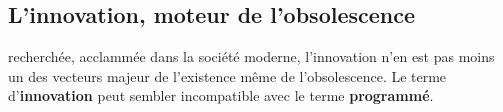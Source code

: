 \subsection{L'innovation, moteur de l'obsolescence}
recherchée, acclammée dans la société moderne, l'innovation n'en est pas moins un des vecteurs majeur de l'existence même de l'obsolescence. Le terme d'\textbf{innovation} peut sembler incompatible avec le terme \textbf{programmé}.
